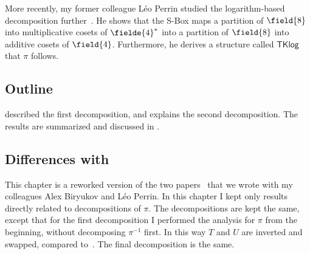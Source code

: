 More recently, my former colleague Léo Perrin studied the logarithm-based decomposition further~\cite{LeoKuz}. He shows that the S-Box maps a partition of $\field{8}$ into multiplicative cosets of $\fielde{4}^*$ into a partition of $\field{8}$ into additive cosets of $\field{4}$. Furthermore, he derives a structure called $\mathsf{TKlog}$ that $\pi$ follows.


\subsection{Outline}
 described the first decomposition, and  explains the second decomposition. The results are summarized and discussed in .

\subsection{Differences with~\cite{OurKuz1,OurKuz2}}
This chapter is a reworked version of the two papers~\cite{OurKuz1,OurKuz2} that we wrote with my colleagues Alex Biryukov and Léo Perrin. In this chapter I kept only results directly related to decompositions of $\pi$. The decompositions are kept the same, except that for the first decomposition I performed the analysis for $\pi$ from the beginning, without decomposing $\pi^{-1}$ first. In this way $T$ and $U$ are inverted and swapped, compared to~\cite{OurKuz1}. The final decomposition is the same.

